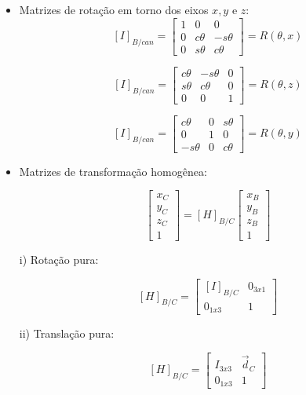 \documentclass[12pt,a4paper]{article}
\begin{document}
\begin{itemize}

\item Matrizes de rotação em torno dos eixos $x,y$ e $z$: \\

$$[I]_{B/can} =
\begin{bmatrix}
1 & 0 & 0 \\
0 & c\theta & -s\theta \\
0 & s\theta & c\theta
\end{bmatrix}
= R(\theta, x) $$

$$[I]_{B/can} =
\begin{bmatrix}
c\theta & -s\theta & 0 \\
s\theta & c\theta & 0 \\
0 & 0 & 1
\end{bmatrix}
= R(\theta, z) $$

$$[I]_{B/can} =
\begin{bmatrix}
c\theta & 0 & s\theta \\
0 & 1 & 0 \\
-s\theta & 0 & c\theta
\end{bmatrix}
= R(\theta, y) $$
\linebreak

\item Matrizes de transformação homogênea:

$$
\begin{bmatrix}
x_C \\
y_C \\
z_C \\
1
\end{bmatrix}
=
[H]_{B/C}
\begin{bmatrix}
x_B \\
y_B \\
z_B \\
1
\end{bmatrix}
$$

\item[i)] Rotação pura:

$$ [H]_{B/C} =
\begin{bmatrix}
[I]_{B/C} & 0_{3x1} \\
0_{1x3} & 1
\end{bmatrix}
$$

\item[ii)] Translação pura:

$$ [H]_{B/C} =
\begin{bmatrix}
I_{3x3} & \vec{d}_C \\
0_{1x3} & 1
\end{bmatrix}
$$


\end{itemize}
\end{document}
